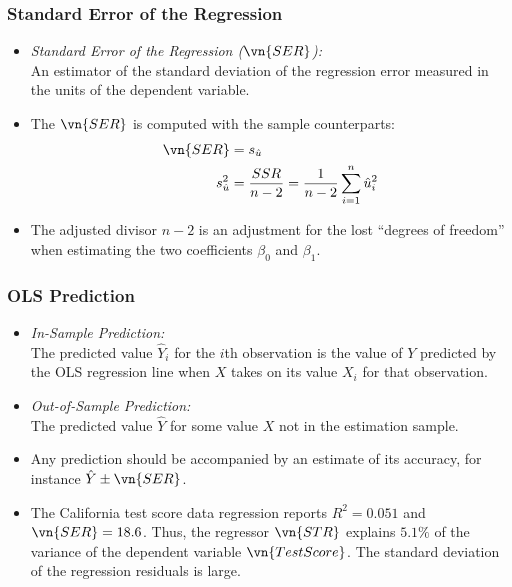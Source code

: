 \begin{frame}
\frametitle{Standard Error of the Regression}
\begin{itemize}
\item \emph{Standard Error of the Regression ($\vn{SER}$):}\\ 
An estimator of the standard deviation of the regression error measured in the units of the dependent variable. 
\item The $\vn{SER}$ is computed with the sample counterparts:
\begin{align*}
\vn{SER} & = s_{\hat{u}}\\
s_{\hat{u}}^2 
    & = \frac{SSR}{n-2}
      = \frac{1}{n-2} \sum_{i=1}^{n} \hat{u}_{i}^2
\end{align*}
\item The adjusted divisor $n-2$ is an adjustment for the lost ``degrees of freedom'' when estimating the two coefficients $\beta_{0}$ and $\beta_{1}$. 
\end{itemize}
\end{frame}


\begin{frame}
\frametitle{OLS Prediction}
\begin{itemize}
\item \emph{In-Sample Prediction:}\\ 
The predicted value $\hat{Y}_{i}$ for the $i$th observation is the value of $Y$ predicted by the OLS regression line when $X$ takes on its value $X_{i}$ for that observation.
\item \emph{Out-of-Sample Prediction:}\\ 
The predicted value $\hat{Y}$ for some value $X$ not in the estimation sample. 
\item Any prediction should be accompanied by an estimate of its accuracy, for instance $\hat{Y} \pm \vn{SER}$. 
\item The California test score data regression reports $R^{2}=0.051$ and $\vn{SER}=18.6$. Thus, the regressor $\vn{STR}$ explains $5.1\%$ of the variance of the dependent variable $\vn{TestScore}$. The standard deviation of the regression residuals is large. 
\end{itemize}
\end{frame}
